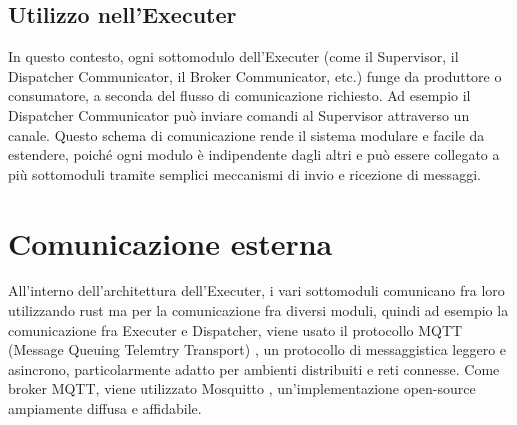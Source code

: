 \documentclass[target=bach,aauheader=,style=]{thud}
\begin{document}
\subsection{Utilizzo nell'Executer}
In questo contesto, ogni sottomodulo dell'Executer (come il Supervisor, il Dispatcher Communicator, il Broker Communicator, etc.) funge da produttore o consumatore, a seconda del flusso di comunicazione richiesto. Ad esempio il Dispatcher Communicator può inviare comandi al Supervisor attraverso un canale.
\newline
Questo schema di comunicazione rende il sistema modulare e facile da estendere, poiché ogni modulo è indipendente dagli altri e può essere collegato a più sottomoduli tramite semplici meccanismi di invio e ricezione di messaggi.

\section{Comunicazione esterna}
All'interno dell'architettura dell'Executer, i vari sottomoduli comunicano fra loro utilizzando rust ma per la comunicazione fra diversi moduli, quindi ad esempio la comunicazione fra Executer e Dispatcher, viene usato il protocollo MQTT (Message Queuing Telemtry Transport) \cite{mqtt2024}, un protocollo di messaggistica leggero e asincrono, particolarmente adatto per ambienti distribuiti e reti connesse. Come broker MQTT, viene utilizzato Mosquitto \cite{mosquitto2024}, un'implementazione open-source ampiamente diffusa e affidabile. 
\end{document}
